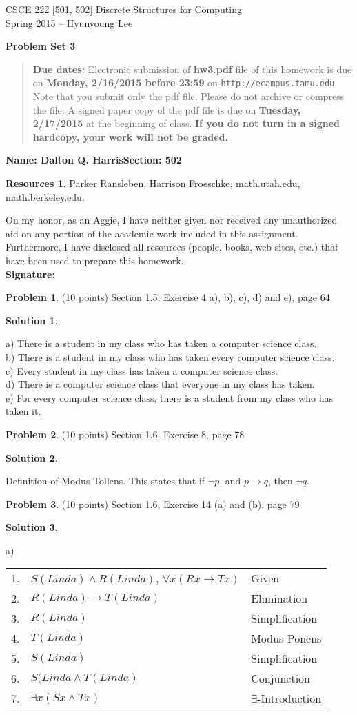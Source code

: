 \documentclass{article}
\theoremstyle{definition}
\newtheorem{problem}{Problem}
\newtheorem*{solution}{Solution}
\newtheorem*{resources}{Resources}
\newcommand{\name}[2]{\noindent\textbf{Name: #1}\hfill \textbf{Section: #2}}
\newcommand{\honor}{\noindent On my honor, as an Aggie, I have neither
  given nor received any unauthorized aid on any portion of the
  academic work included in this assignment. Furthermore, I have
  disclosed all resources (people, books, web sites, etc.) that have
  been used to prepare this homework. \\[2ex]
 \textbf{Signature:} \underline{\hspace*{8cm}} }
\newcommand{\problemset}[1]{\begin{center}\textbf{Problem Set #1}\end{center}}
\newcommand{\duedate}[2]{\begin{quote}\textbf{Due dates:} Electronic
    submission of \textbf{hw3.pdf} file of this homework is due on
    \textbf{#1} on \texttt{http://ecampus.tamu.edu}. Note that you submit 
    only the pdf file. Please do not archive or compress the file.  
    A signed paper copy of the pdf file is due on
    \textbf{#2} at the beginning of class.
    \textbf{If you do not turn in a signed hardcopy, your work will not be graded.}\end{quote} }
\begin{document}
\vspace*{-15mm}
\begin{center}
{\large
CSCE 222 [501, 502] Discrete Structures for Computing\\[.5ex]
Spring 2015 -- Hyunyoung Lee\\}
\end{center}
\problemset{3}
\duedate{Monday, 2/16/2015 before 23:59}{Tuesday, 2/17/2015}
\name{Dalton Q. Harris}{502}
\begin{resources} Parker Ransleben, Harrison Froeschke, math.utah.edu, math.berkeley.edu.
\end{resources}
\honor
\bigskip
\begin{problem} (10 points)
Section 1.5, Exercise 4 a), b), c), d) and e), page 64
\end{problem}
\begin{solution}	
\end{solution}		\noindent a) There is a student in my class who has taken a computer science class. \\
				b) There is a student in my class who has taken every computer science class. \\
				c) Every student in my class has taken a computer science class. \\
				d) There is a computer science class that everyone in my class has taken. \\
				e) For every computer science class, there is a student from my class who has taken it.

\begin{problem} (10 points)
Section 1.6, Exercise 8, page 78
\end{problem}
\begin{solution}
\end{solution}		\noindent Definition of Modus Tollens. This states that if $\neg p$, and $p\rightarrow q$, 					then $\neg q$.

\begin{problem} (10 points)
Section 1.6, Exercise 14 (a) and (b), page 79
\end{problem}
\begin{solution}
\end{solution}		a) 	\begin{tabular}{| l | l | l |} \hline
					1. & $S(Linda) \wedge R(Linda)$, $\forall x(Rx \rightarrow Tx)$	& Given \\
					2. & $R(Linda) \rightarrow T(Linda)$ 						& Elimination \\
					3. & $R(Linda) $									& Simplification \\
					4. & $T(Linda)$										& Modus Ponens \\
					5. & $S(Linda)$										& Simplification \\
					6. & $S(Linda \wedge T(Linda)$						& Conjunction \\
					7. & $\exists x(Sx \wedge Tx)$						& $\exists$-Introduction \\
					\hline
					\end{tabular}
				
\end{document}
